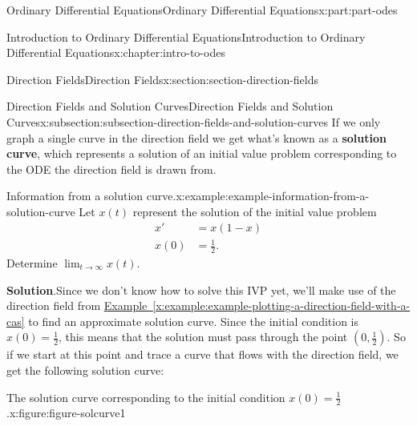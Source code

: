 \documentclass[oneside,10pt,]{book}
\newcommand{\blocktitlefont}{\relax}
\newcommand{\xreffont}{\relax}
\newcommand{\terminology}[1]{\textbf{#1}}
\numberwithin{equation}{part}
\begin{document}
\begin{partptx}{Ordinary Differential Equations}{}{Ordinary Differential Equations}{}{}{x:part:part-odes}
\begin{chapterptx}{Introduction to Ordinary Differential Equations}{}{Introduction to Ordinary Differential Equations}{}{}{x:chapter:intro-to-odes}
\begin{sectionptx}{Direction Fields}{}{Direction Fields}{}{}{x:section:section-direction-fields}
\begin{subsectionptx}{Direction Fields and Solution Curves}{}{Direction Fields and Solution Curves}{}{}{x:subsection:subsection-direction-fields-and-solution-curves}
If we only graph a single curve in the direction field we get what's known as a \terminology{solution curve}, which represents a solution of an initial value problem corresponding to the ODE the direction field is drawn from.%
\begin{example}{Information from a solution curve.}{x:example:example-information-from-a-solution-curve}%
Let \(x(t)\) represent the solution of the initial value problem%
\begin{align*}
x' & = x(1-x) \\
x(0) & = \frac{1}{2}. 
\end{align*}
Determine \(\lim_{t\to\infty}x(t)\).%
\par\smallskip%
\noindent\textbf{\blocktitlefont Solution}.\hypertarget{g:solution:idp105548780136224}{}\quad{}Since we don't know how to solve this IVP yet, we'll make use of the direction field from \hyperref[x:example:example-plotting-a-direction-field-with-a-cas]{Example~{\xreffont\ref{x:example:example-plotting-a-direction-field-with-a-cas}}} to find an approximate solution curve. Since the initial condition is \(x(0) = \frac{1}{2}\), this means that the solution must pass through the point \((0,\frac{1}{2})\). So if we start at this point and trace a curve that flows with the direction field, we get the following solution curve:%
\begin{figureptx}{The solution curve corresponding to the initial condition \(x(0) = \frac{1}{2}\).}{x:figure:figure-solcurve1}{}%
\begin{image}{0.25}{0.5}{0.25}%

\end{image}
\end{figureptx}
\end{example}
\end{subsectionptx}
\end{sectionptx}
\end{chapterptx}
\end{partptx}
\end{document}
